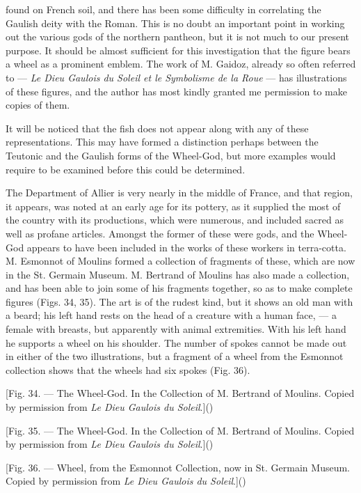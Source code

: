 \documentclass[a4paper, 11pt, oneside, polutonikogreek, english]{article}
\begin{document}
found on French soil, and there has been some difficulty in correlating the Gaulish deity with the Roman. This is no doubt an important point in working out the various gods of the northern pantheon, but it is not much to our present purpose. It should be almost sufficient for this investigation that the figure bears a wheel as a prominent emblem. The work of M. Gaidoz, already so often referred to --- \emph{Le Dieu Gaulois du Soleil et le Symbolisme de la Roue} --- has illustrations of these figures, and the author has most kindly granted me permission to make copies of them.

It will be noticed that the fish does not appear along with any of these representations. This may have formed a distinction perhaps between the Teutonic and the Gaulish forms of the Wheel-God, but more examples would require to be examined before this could be determined.

The Department of Allier is very nearly in the middle of France, and that region, it appears, was noted at an early age for its pottery, as it supplied the most of the country with its productions, which were numerous, and included sacred as well as profane articles. Amongst the former of these were gods, and the Wheel-God appears to have been included in the works of these workers in terra-cotta. M. Esmonnot of Moulins formed a collection of fragments of these, which are now in the St. Germain Museum. M. Bertrand of Moulins has also made a collection, and has been able to join some of his fragments together, so as to make complete figures (Figs. 34, 35). The art is of the rudest kind, but it shows an old man with a beard; his left hand rests on the head of a creature with a human face, --- a female with breasts, but apparently with animal extremities. With his left hand he supports a wheel on his shoulder. The number of spokes cannot be made out in either of the two illustrations, but a fragment of a wheel from the Esmonnot collection shows that the wheels had six spokes (Fig. 36).

[Fig. 34. --- The Wheel-God. In the Collection of M. Bertrand of Moulins. Copied by permission from \emph{Le Dieu Gaulois du Soleil}.]()

[Fig. 35. --- The Wheel-God. In the Collection of M. Bertrand of Moulins. Copied by permission from \emph{Le Dieu Gaulois du Soleil}.]()

[Fig. 36. --- Wheel, from the Esmonnot Collection, now in St. Germain Museum. Copied by permission from \emph{Le Dieu Gaulois du Soleil}.]()
\end{document}
